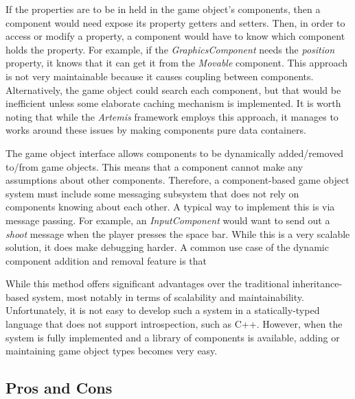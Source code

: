 \documentclass[
    phd,
    electronic,
    letterpaper,
    simplechapterheading,
    openany,
    parttop,
    lof,
]{byumsphd}
\begin{document}
If the properties are to be in held in the game object's components, then a component would need expose its property getters and setters. Then, in order to access or modify a property, a component would have to know which component holds the property. For example, if the \textit{GraphicsComponent} needs the \textit{position} property, it knows that it can get it from the \textit{Movable} component. This approach is not very maintainable because it causes coupling between components. Alternatively, the game object could search each component, but that would be inefficient unless some elaborate caching mechanism is implemented. It is worth noting that while the \textit{Artemis} framework employs this approach, it manages to works around these issues by making components pure data containers.

The game object interface allows components to be dynamically added/removed to/from game objects. This means that a component cannot make any assumptions about other components. Therefore, a component-based game object system must include some messaging subsystem that does not rely on components knowing about each other. A typical way to implement this is via message passing. For example, an \textit{InputComponent} would want to send out a \textit{shoot} message when the player presses the space bar.  While this is a very scalable solution, it does make debugging harder. A common use case of the dynamic component addition and removal feature is that

While this method offers significant advantages over the traditional inheritance-based system, most notably in terms of scalability and maintainability. Unfortunately, it is not easy to develop such a system in a statically-typed language that does not support introspection, such as C++. However, when the system is fully implemented and a library of components is available, adding or maintaining game object types becomes very easy.

\subsection{Pros and Cons}
\end{document}
